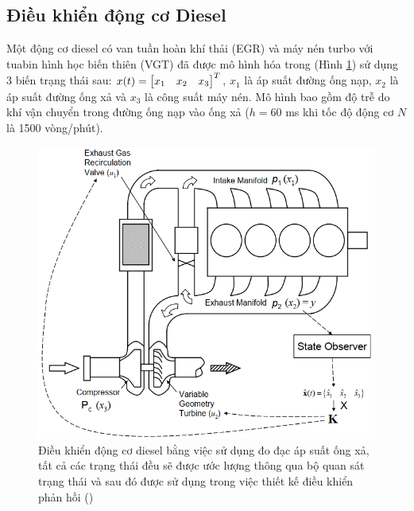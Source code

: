 \subsection{Điều khiển động cơ Diesel}


Một động cơ diesel có van tuần hoàn khí thải (EGR) và máy nén turbo với tuabin hình học biến thiên (VGT) đã được mô hình hóa trong \cite{JanK00} (Hình \ref{fig:dieselenginecontrol}) 
sử dụng 3 biến trạng thái sau: $x(t) = \begin{bmatrix} x_1 & x_2 & x_3 \end{bmatrix}^T$, $x_1$ là áp suất đường ống nạp, $x_2$ là áp suất đường ống xả và $x_3$ là công suất máy nén. Mô hình bao gồm độ trễ do khí vận chuyển trong đường ống nạp vào ống xả ($h = 60$ ms khi tốc độ động cơ $N$ là 1500 vòng/phút). 

\begin{figure}[h!]
	\centering
	\includegraphics[width=0.7\linewidth]{hinh/diesel_engine_control}
	\caption{Điều khiển động cơ diesel bằng việc sử dụng đo đạc áp suất ống xả, tất cả các trạng thái đều sẽ được ước lượng thông qua bộ quan sát trạng thái và sau đó được sử dụng trong việc thiết kế điều khiển phản hồi (\cite{JanK09})}
	\label{fig:dieselenginecontrol}
\end{figure}

